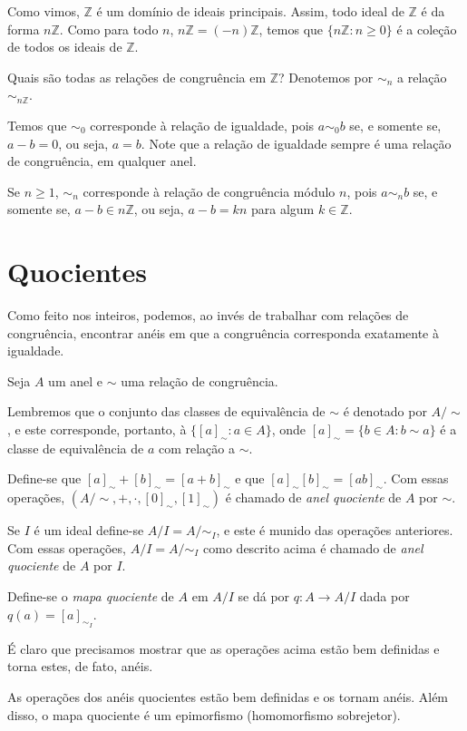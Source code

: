 \begin{exemplo}
Como vimos, $\mathbb Z$ é um domínio de ideais principais.
Assim, todo ideal de $\mathbb Z$ é da forma $n\mathbb Z$.
Como para todo $n$, $n\mathbb Z=(-n)\mathbb Z$, temos que $\{n\mathbb Z: n\geq 0\}$ é a coleção de todos os ideais de $\mathbb Z$.

Quais são todas as relações de congruência em $\mathbb Z$?
Denotemos por $\sim_n$ a relação $\sim_{n\mathbb Z}$.

Temos que $\sim_0$ corresponde à relação de igualdade, pois $a\sim_0 b$ se, e somente se, $a-b=0$, ou seja, $a=b$.
Note que a relação de igualdade sempre é uma relação de congruência, em qualquer anel.

Se $n\geq 1$, $\sim_n$ corresponde à relação de congruência módulo $n$, pois $a\sim_n b$ se, e somente se, $a-b\in n\mathbb Z$, ou seja, $a-b=kn$ para algum $k\in \mathbb Z$.
\end{exemplo}

\section{Quocientes}

Como feito nos inteiros, podemos, ao invés de trabalhar com relações de congruência, encontrar anéis em que a congruência corresponda exatamente à igualdade.

\begin{definition}
Seja $A$ um anel e $\sim$ uma relação de congruência.

Lembremos que o conjunto das classes de equivalência de $\sim$ é denotado por $A/\sim$, e este corresponde, portanto, à $\{[a]_\sim: a \in A\}$, onde $[a]_\sim=\{b\in A: b\sim a\}$ é a classe de equivalência de $a$ com relação a $\sim$.

Define-se que $[a]_\sim+[b]_\sim=[a+b]_\sim$ e que $[a]_\sim[b]_\sim=[ab]_\sim$.
Com essas operações, $(A/\sim, +, \cdot, [0]_\sim, [1]_\sim)$ é chamado de \emph{anel quociente} de $A$ por $\sim$.

Se $I$ é um ideal define-se $A/I=A/\sim_I$, e este é munido das operações anteriores.
Com essas operações, $A/I=A/{\sim_I}$ como descrito acima é chamado de \emph{anel quociente} de $A$ por $I$.

Define-se o \emph{mapa quociente} de $A$ em $A/I$ se dá por $q:A\longrightarrow A/I$ dada por $q(a)=[a]_{\sim_I}$.
\end{definition}

É claro que precisamos mostrar que as operações acima estão bem definidas e torna estes, de fato, anéis.
\begin{lemma}
    As operações dos anéis quocientes estão bem definidas e os tornam anéis.
    Além disso, o mapa quociente é um epimorfismo (homomorfismo sobrejetor).
\end{lemma}


